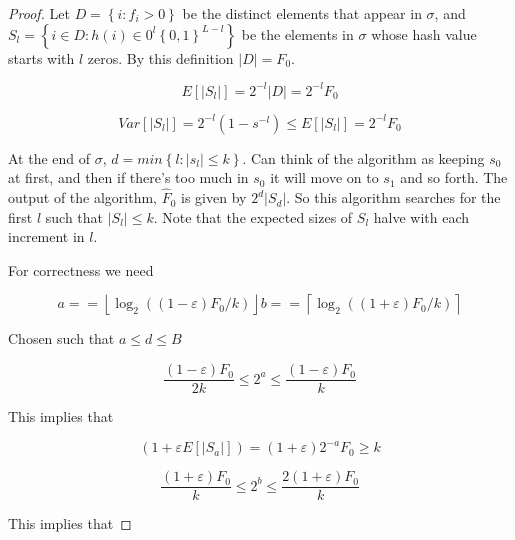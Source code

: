 \documentclass[../notes.tex]{subfiles}
\begin{document}
\begin{proof}
    Let $ D = \left\{ i : f_i > 0 \right\}  $ be the distinct elements that appear in $ \sigma $, and  $ S_l = \left\{ i \in D : h(i) \in 0^l \left\{ 0,1 \right\} ^{L-l} \right\}  $ be the elements in $ \sigma $ whose hash value starts with $ l $ zeros.
    By this definition $ |D| = F_0 $.

    \begin{equation}
    E[|S_l|] = 2^{-l} |D| = 2^{-l} F_0
    \end{equation}

    \begin{equation}
        Var[|S_l|] = 2^{-l} (1-s^{-l}) \le  E[|S_l|]  = 2^{-l} F_0
    \end{equation}
    

    At the end of $ \sigma $, $ d = min \left\{  l: |s_l| \le  k \right\} $. 
    Can think of the algorithm as keeping $ s_0 $ at first, and then if there's too much in $ s_0 $ it will move on to $ s_1 $ and so forth.
    The output of the algorithm, $ \hat{F}_0 $ is given by $ 2^d |S_d| $. So this algorithm searches for the first $ l $ such that $ |S_l| \le  k$.
    Note that the expected sizes of $ S_l $ halve with each increment in $ l $.


    For correctness we need

   \begin{equation}
       a == \left\lfloor \log_2 ((1-\varepsilon) F_0 / k )  \right\rfloor
       b == \left\lceil  \log_2 ((1+\varepsilon) F_0 / k )  \right\rceil 
   \end{equation}

   Chosen such that $  a \le  d \le  B$

   \begin{equation}
       \frac{(1-\varepsilon) F_0}{2k} \le  2^a \le  \frac{(1-\varepsilon) F_0}{k}
   \end{equation}

   This implies that 

   \begin{equation}
       (1+\varepsilon E[|S_a|]) = (1+\varepsilon) 2^{-a} F_0 \ge  k
   \end{equation}
   

   \begin{equation}
       \frac{(1+\varepsilon) F_0}{k} \le  2^b \le  \frac{2(1+\varepsilon) F_0}{k}
   \end{equation}

   This implies that


\end{proof}
\end{document}
